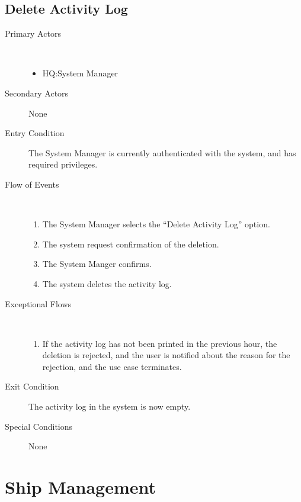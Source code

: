 \documentclass[a4paper,10pt]{report}
\begin{document}
\section{Delete Activity Log}
\begin{description}
\item[Primary Actors] \
  \begin{itemize}
  \item HQ:System Manager
  \end{itemize}
\item[Secondary Actors] None
\item[Entry Condition]
  The System Manager is currently authenticated with the system, and has required privileges.
\item[Flow of Events] \
  \begin{enumerate}
  \item The System Manager selects the ``Delete Activity Log'' option.
  \item The system request confirmation of the deletion.
  \item The System Manger confirms.
  \item The system deletes the activity log.
  \end{enumerate}
\item[Exceptional Flows]  \
  \begin{enumerate}
  \item If the activity log has not been printed in the previous hour, the deletion is rejected, and the user is notified about the reason for the rejection, and the use case terminates.
  \end{enumerate}
\item[Exit Condition]
  The activity log in the system is now empty.
\item[Special Conditions] None
\end{description}

\chapter{Ship Management}
\end{document}
